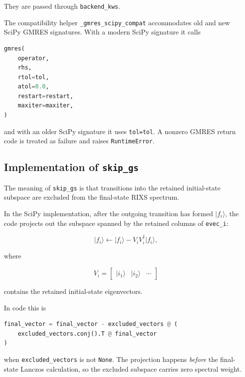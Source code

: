\documentclass[11pt]{article}
\begin{document}
They are passed through \texttt{backend\_kws}.

The compatibility helper \texttt{\_gmres\_scipy\_compat} accommodates old and new SciPy GMRES signatures.  With a modern SciPy signature it calls

\begin{lstlisting}[language=Python]
gmres(
    operator,
    rhs,
    rtol=tol,
    atol=0.0,
    restart=restart,
    maxiter=maxiter,
)
\end{lstlisting}

and with an older SciPy signature it uses \texttt{tol=tol}.  A nonzero GMRES return code is treated as failure and raises \texttt{RuntimeError}.

\subsection{Implementation of \texttt{skip\_gs}}

The meaning of \texttt{skip\_gs} is that transitions into the retained initial-state subspace are excluded from the final-state RIXS spectrum.

In the SciPy implementation, after the outgoing transition has formed \(|f_i\rangle\), the code projects out the subspace spanned by the retained columns of \texttt{evec\_i}:

\begin{equation}
  |f_i\rangle
  \leftarrow
  |f_i\rangle
  - V_i V_i^\dagger |f_i\rangle,
\end{equation}

where

\begin{equation}
  V_i = \begin{bmatrix}|i_1\rangle & |i_2\rangle & \cdots\end{bmatrix}
\end{equation}

contains the retained initial-state eigenvectors.

In code this is

\begin{lstlisting}[language=Python]
final_vector = final_vector - excluded_vectors @ (
    excluded_vectors.conj().T @ final_vector
)
\end{lstlisting}

when \texttt{excluded\_vectors} is not \texttt{None}.  The projection happens \emph{before} the final-state Lanczos calculation, so the excluded subspace carries zero spectral weight.
\end{document}

